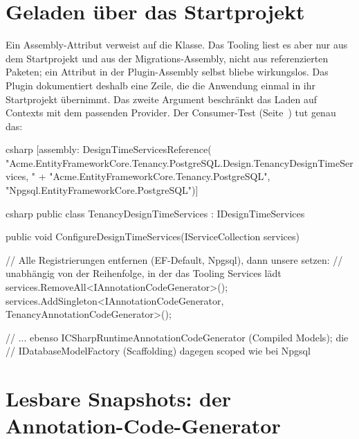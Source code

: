 \section{Geladen über das Startprojekt}

Ein Assembly-Attribut verweist auf die Klasse. Das Tooling liest es aber nur aus dem
Startprojekt und aus der Migrations-Assembly, nicht aus referenzierten Paketen; ein Attribut
in der Plugin-Assembly selbst bliebe wirkungslos. Das Plugin dokumentiert deshalb eine Zeile,
die die Anwendung einmal in ihr Startprojekt übernimmt. Das zweite Argument beschränkt das
Laden auf Contexts mit dem passenden Provider. Der Consumer-Test
(Seite~\pageref{sec:consumer-test}) tut genau das:

\begin{sourcecode}{csharp}
[assembly: DesignTimeServicesReference(
    "Acme.EntityFrameworkCore.Tenancy.PostgreSQL.Design.TenancyDesignTimeServices, "
        + "Acme.EntityFrameworkCore.Tenancy.PostgreSQL",
    "Npgsql.EntityFrameworkCore.PostgreSQL")]
\end{sourcecode}

\begin{sourcecode}{csharp}
public class TenancyDesignTimeServices : IDesignTimeServices
{
    public void ConfigureDesignTimeServices(IServiceCollection services)
    {
        // Alle Registrierungen entfernen (EF-Default, Npgsql), dann unsere setzen:
        // unabhängig von der Reihenfolge, in der das Tooling Services lädt
        services.RemoveAll<IAnnotationCodeGenerator>();
        services.AddSingleton<IAnnotationCodeGenerator, TenancyAnnotationCodeGenerator>();

        // ... ebenso ICSharpRuntimeAnnotationCodeGenerator (Compiled Models); die
        // IDatabaseModelFactory (Scaffolding) dagegen scoped wie bei Npgsql
    }
}
\end{sourcecode}

\section{Lesbare Snapshots: der Annotation-Code-Generator}

